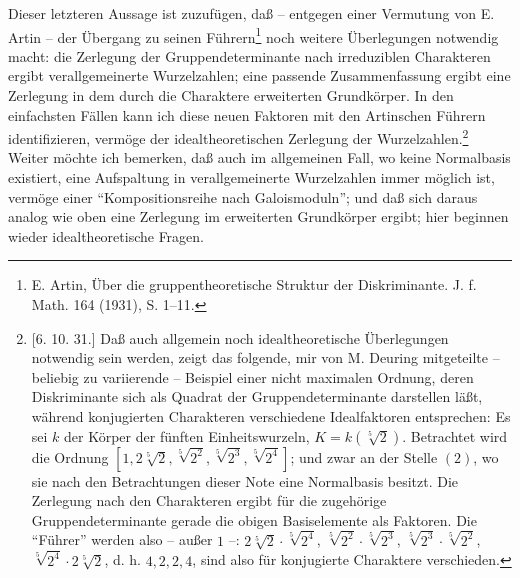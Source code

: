 Dieser letzteren Aussage ist zuzufügen, daß -- entgegen einer Vermutung von E. Artin -- der Übergang zu seinen Führern\footnote{E. Artin, Über die gruppentheoretische Struktur der Diskriminante. J. f. Math. 164 (1931), S. 1--11.} noch weitere Überlegungen notwendig macht: die Zerlegung der Gruppendeterminante nach irreduziblen Charakteren ergibt verallgemeinerte Wurzelzahlen; eine passende Zusammenfassung ergibt eine Zerlegung in dem durch die Charaktere erweiterten Grundkörper. In den einfachsten Fällen kann ich diese neuen Faktoren mit den Artinschen Führern identifizieren, vermöge der idealtheoretischen Zerlegung der Wurzelzahlen.\footnote{[6. 10. 31.] Daß auch allgemein noch idealtheoretische Überlegungen notwendig sein werden, zeigt das folgende, mir von M. Deuring mitgeteilte -- beliebig zu variierende -- Beispiel einer nicht maximalen Ordnung, deren Diskriminante sich als Quadrat der Gruppendeterminante darstellen läßt, während konjugierten Charakteren verschiedene Idealfaktoren entsprechen: Es sei \(k\) der Körper der fünften Einheitswurzeln, \(K=k(\sqrt[5]{2})\). Betrachtet wird die Ordnung \([1,2\sqrt[5]{2},\sqrt[5]{2^2},\sqrt[5]{2^3},\sqrt[5]{2^4}]\); und zwar an der Stelle \((2)\), wo sie nach den Betrachtungen dieser Note eine Normalbasis besitzt. Die Zerlegung nach den Charakteren ergibt für die zugehörige Gruppendeterminante gerade die obigen Basiselemente als Faktoren. Die ``Führer'' werden also -- außer \(1\) --: \(2\sqrt[5]{2}\cdot\sqrt[5]{2^4}\), \(\sqrt[5]{2^2}\cdot\sqrt[5]{2^3}\), \(\sqrt[5]{2^3}\cdot\sqrt[5]{2^2}\), \(\sqrt[5]{2^4}\cdot 2\sqrt[5]{2}\), d. h. \(4,2,2,4\), sind also für konjugierte Charaktere verschieden.} Weiter möchte ich bemerken, daß auch im allgemeinen Fall, wo keine Normalbasis existiert, eine Aufspaltung in verallgemeinerte Wurzelzahlen immer möglich ist, vermöge einer ``Kompositionsreihe nach Galoismoduln''; und daß sich daraus analog wie oben eine Zerlegung im erweiterten Grundkörper ergibt; hier beginnen wieder idealtheoretische Fragen.

